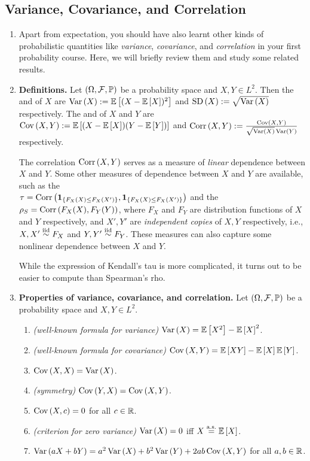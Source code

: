 \subsection{Variance, Covariance, and Correlation}
\begin{enumerate}
\item Apart from expectation, you should have also learnt other kinds of
probabilistic quantities like \emph{variance}, \emph{covariance}, and
\emph{correlation} in your first probability course. Here, we will briefly
review them and study some related results.
\item \textbf{Definitions.} Let \((\Omega,\mathcal{F},\mathbb{P})\) be a probability
space and \(X,Y\in L^2\). Then the  and  of \(X\) are \(\operatorname{Var}\left(X\right):=\mathbb{E}\left[(X-\mathbb{E}\left[X\right])^{2}\right]\) and
\(\operatorname{SD}\left(X\right):=\sqrt{\operatorname{Var}\left(X\right)}\) respectively. The  and 
of \(X\) and \(Y\) are \(\operatorname{Cov}\left(X,Y\right):=\mathbb{E}\left[(X-\mathbb{E}\left[X\right])(Y-\mathbb{E}\left[Y\right])\right]\) and
\(\operatorname{Corr}\left(X,Y\right):=\frac{\operatorname{Cov}\left(X,Y\right)}{\sqrt{\operatorname{Var}\left(X\right)}\operatorname{Var}\left(Y\right)}\) respectively.

\begin{note}
The correlation \(\operatorname{Corr}\left(X,Y\right)\) serves as a measure of \emph{linear} dependence
between \(X\) and \(Y\). Some other measures of dependence between \(X\) and
\(Y\) are available, such as the  \\
\(\tau=\operatorname{Corr}\left(\mathbf{1}_{\left\{F_X(X)\le F_X(X')\right\}},\mathbf{1}_{\left\{F_X(X)\le F_X(X')\right\}}\right)\)
and the  \(\rho_S=\operatorname{Corr}\left(F_X(X),F_Y(Y)\right)\), where \(F_X\)
and \(F_Y\) are distribution functions of \(X\) and \(Y\) respectively, and
\(X',Y'\) are \emph{independent copies} of \(X,Y\) respectively, i.e.,
\(X,X'\overset{\text{iid}}\sim F_X\) and \(Y,Y'\overset{\text{iid}}\sim F_Y\). These measures can also capture some
nonlinear dependence between \(X\) and \(Y\).

While the expression of Kendall's tau is more complicated, it turns out to be
easier to compute than Spearman's rho.
\end{note}
\item\label{it:var-cov-corr-prop} \textbf{Properties of variance, covariance,
and correlation.} Let \((\Omega,\mathcal{F},\mathbb{P})\) be a probability space and
\(X,Y\in L^2\).
\begin{enumerate}
\item \emph{(well-known formula for variance)} \(\operatorname{Var}\left(X\right)=\mathbb{E}\left[X^{2}\right]-\mathbb{E}\left[X\right]^{2}\).
\item \emph{(well-known formula for covariance)} \(\operatorname{Cov}\left(X,Y\right)=\mathbb{E}\left[XY\right]-\mathbb{E}\left[X\right]\mathbb{E}\left[Y\right]\).
\item \(\operatorname{Cov}\left(X,X\right)=\operatorname{Var}\left(X\right)\).
\item \emph{(symmetry)} \(\operatorname{Cov}\left(Y,X\right)=\operatorname{Cov}\left(X,Y\right)\).
\item \(\operatorname{Cov}\left(X,c\right)=0\) for all \(c\in\mathbb{R}\).
\item \emph{(criterion for zero variance)} \(\operatorname{Var}\left(X\right)=0\) iff \(X\overset{\text{a.s.}}= \mathbb{E}\left[X\right]\).
\item \(\operatorname{Var}\left(aX+bY\right)=a^{2}\operatorname{Var}\left(X\right)+b^{2}\operatorname{Var}\left(Y\right)+2ab\operatorname{Cov}\left(X,Y\right)\) for all \(a,b\in\mathbb{R}\).


\end{enumerate}
\end{enumerate}
